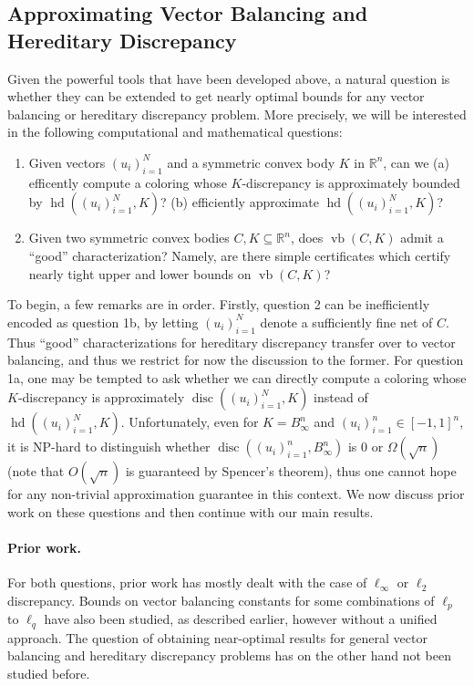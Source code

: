 \documentclass[11pt]{article}
\newcommand{\R}{{\mathbb{R}}}
\DeclareMathOperator{\disc}{disc}
\DeclareMathOperator{\hd}{hd}
\DeclareMathOperator{\vb}{vb}
\begin{document}
\subsection{Approximating Vector Balancing and Hereditary Discrepancy}

Given the powerful tools that have been developed above, a natural question is
whether they can be extended to get nearly optimal bounds for any vector
balancing or hereditary discrepancy problem. More precisely, we will be
interested in the following computational and mathematical questions: 

\begin{enumerate}
\item Given vectors $(u_i)_{i=1}^N$ and a symmetric convex body $K$ in $\R^n$,
can we (a) efficently compute a coloring whose $K$-discrepancy is approximately
bounded by $\hd((u_i)_{i=1}^N,K)$? (b) efficiently approximate $\hd((u_i)_{i=1}^N,K)$?
\item Given two symmetric convex bodies $C,K \subseteq \R^n$, does $\vb(C,K)$
admit a ``good'' characterization? Namely, are there simple certificates which
certify nearly tight upper and lower bounds on $\vb(C,K)$?
\end{enumerate}

To begin, a few remarks are in order.  Firstly, question 2 can be inefficiently
encoded as question 1b, by letting $(u_i)_{i=1}^N$ denote a sufficiently fine
net of $C$. Thus ``good'' characterizations for hereditary discrepancy transfer
over to vector balancing, and thus we restrict for now the discussion to the
former. For question 1a, one may be tempted to ask whether we can directly
compute a coloring whose $K$-discrepancy is approximately
$\disc((u_i)_{i=1}^N,K)$ instead of $\hd((u_i)_{i=1}^N,K)$. Unfortunately, even
for $K = B_\infty^n$ and $(u_i)_{i=1}^n \in [-1,1]^n$, it is NP-hard to
distinguish whether $\disc((u_i)_{i=1}^n,B_\infty^n)$ is $0$ or
$\Omega(\sqrt{n})$ (note that $O(\sqrt{n})$ is guaranteed by Spencer's theorem),
thus one cannot hope for any non-trivial approximation guarantee in this
context. We now discuss prior work on these questions and then continue with our
main results. 

\paragraph{Prior work.} For both questions, prior work has mostly dealt with the
case of $\ell_\infty$ or $\ell_2$ discrepancy. Bounds on vector balancing
constants for some combinations of $\ell_p$ to $\ell_q$ have also been studied,
as described earlier, however without a unified approach. The question of
obtaining near-optimal results for general vector balancing and hereditary
discrepancy problems has on the other hand not been studied before. 
\end{document}
